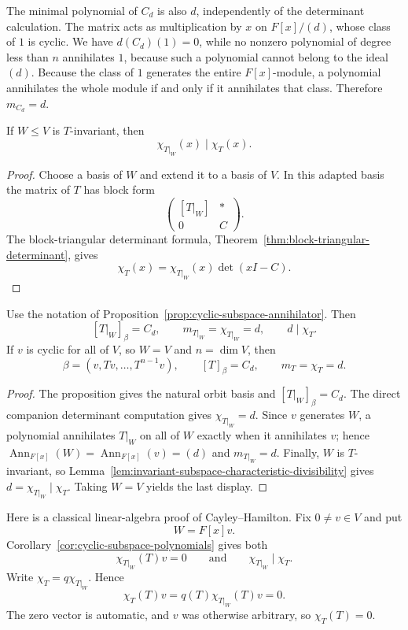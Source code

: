 The minimal polynomial of \(C_d\) is also \(d\), independently of the
determinant calculation. The matrix acts as multiplication by \(x\) on
\(F[x]/(d)\), whose class of \(1\) is cyclic. We have \(d(C_d)(1)=0\), while
no nonzero polynomial of degree less than \(n\) annihilates \(1\), because
such a polynomial cannot belong to the ideal \((d)\). Because the class of
\(1\) generates the entire \(F[x]\)-module, a polynomial annihilates the
whole module if and only if it annihilates that class. Therefore
\(m_{C_d}=d\).

\begin{lemma}
\label{lem:invariant-subspace-characteristic-divisibility}
If \(W\leq V\) is \(T\)-invariant, then
\[
\chi_{T|_W}(x)\mid\chi_T(x).
\]
\end{lemma}
\begin{proof}
Choose a basis of \(W\) and extend it to a basis of \(V\). In this adapted
basis the matrix of \(T\) has block form
\[
\begin{pmatrix}[T|_W]&*\\0&C\end{pmatrix}.
\]
The block-triangular determinant formula,
Theorem~\ref{thm:block-triangular-determinant}, gives
\[
\chi_T(x)=\chi_{T|_W}(x)\det(xI-C).
\]
\end{proof}

\begin{corollary}
\label{cor:cyclic-subspace-polynomials}
Use the notation of Proposition~\ref{prop:cyclic-subspace-annihilator}. Then
\[
[T|_W]_\beta=C_d,
\qquad
m_{T|_W}=\chi_{T|_W}=d,
\qquad
d\mid\chi_T.
\]
If \(v\) is cyclic for all of \(V\), so \(W=V\) and \(n=\dim V\), then
\[
\beta=(v,Tv,\ldots,T^{n-1}v),\qquad
[T]_\beta=C_d,\qquad
m_T=\chi_T=d.
\]
\end{corollary}
\begin{proof}
The proposition gives the natural orbit basis and
\([T|_W]_\beta=C_d\). The direct companion determinant computation gives
\(\chi_{T|_W}=d\). Since \(v\) generates \(W\), a polynomial annihilates
\(T|_W\) on all of \(W\) exactly when it annihilates \(v\); hence
\(\operatorname{Ann}_{F[x]}(W)=\operatorname{Ann}_{F[x]}(v)=(d)\) and
\(m_{T|_W}=d\). Finally, \(W\) is \(T\)-invariant, so
Lemma~\ref{lem:invariant-subspace-characteristic-divisibility} gives
\(d=\chi_{T|_W}\mid\chi_T\). Taking \(W=V\) yields the last display.
\end{proof}

\begin{remark}
Here is a classical linear-algebra proof of Cayley--Hamilton. Fix
\(0\ne v\in V\) and put
\[
W=F[x]v.
\]
Corollary~\ref{cor:cyclic-subspace-polynomials} gives both
\[
\chi_{T|_W}(T)v=0
\qquad\text{and}\qquad
\chi_{T|_W}\mid\chi_T.
\]
Write
\(\chi_T=q\chi_{T|_W}\). Hence
\[
\chi_T(T)v=q(T)\chi_{T|_W}(T)v=0.
\]
The zero vector is automatic, and \(v\) was otherwise arbitrary, so
\(\chi_T(T)=0\).
\end{remark}

